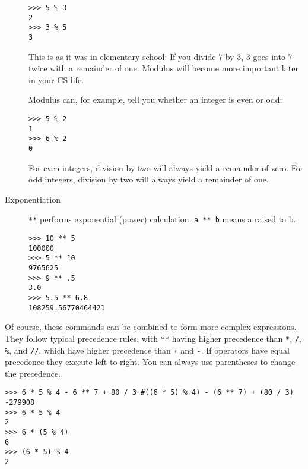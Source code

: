\documentclass[12pt,hidelinks]{article}
\begin{document}
\begin{description}
    \begin{lstlisting}[style=bash]
>>> 5 % 3
2
>>> 3 % 5
3
    \end{lstlisting}

    This is as it was in elementary school: If you divide 7 by 3, 3 goes into 7
    twice with a remainder of one. Modulus will become more important later in
    your CS life.

    Modulus can, for example, tell you whether an integer is even or odd:
    \begin{lstlisting}[style=bash]
>>> 5 % 2
1
>>> 6 % 2
0
    \end{lstlisting}
    For even integers, division by two will always yield a remainder of zero.
    For odd integers, division by two will always yield a remainder of one.

  \item[Exponentiation] \texttt{**} performs exponential (power) calculation.
    \texttt{a ** b} means a raised to b.

    \begin{lstlisting}[style=bash]
>>> 10 ** 5
100000
>>> 5 ** 10 
9765625
>>> 9 ** .5
3.0
>>> 5.5 ** 6.8
108259.56770464421
    \end{lstlisting}

%
%
\end{description}

Of course, these commands can be combined to form more complex expressions. They
follow typical precedence rules, with \texttt{**} having higher precedence than
\texttt{*}, \texttt{/}, \texttt{\%}, and \texttt{//}, which have higher
precedence than \texttt{+} and \texttt{-}. If operators have equal precedence
they execute left to right. You can always use parentheses to change the
precedence.

\begin{lstlisting}[style=bash]
>>> 6 * 5 % 4 - 6 ** 7 + 80 / 3 #((6 * 5) % 4) - (6 ** 7) + (80 / 3)
-279908
>>> 6 * 5 % 4
2
>>> 6 * (5 % 4)
6
>>> (6 * 5) % 4
2
\end{lstlisting}
\end{document}
